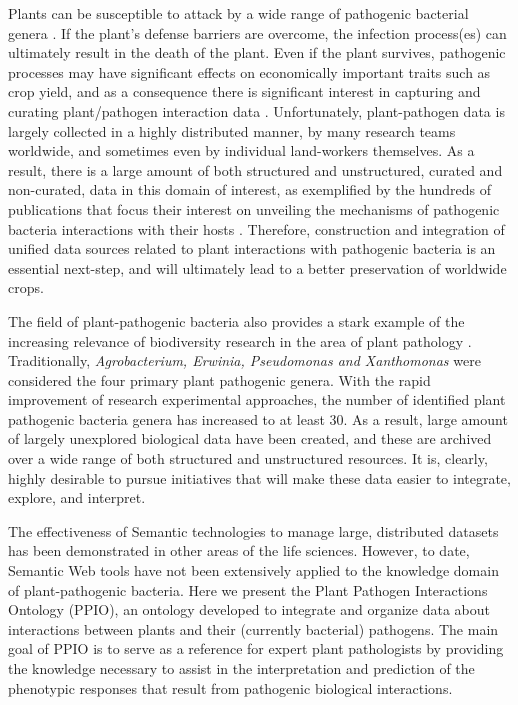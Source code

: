 \documentclass[sw]{iosart2c}
\begin{document}
Plants can be susceptible to attack by a wide range of pathogenic bacterial genera \cite{Mansfield}. If the plant's defense barriers are overcome, the infection process(es) can ultimately result in the death of the plant. Even if the plant survives, pathogenic processes may have significant effects on economically important traits such as crop yield, and as a consequence there is significant interest in capturing and curating plant/pathogen interaction data \cite{Montesinos}. Unfortunately, plant-pathogen data is largely collected in a highly distributed manner, by many research teams worldwide, and sometimes even by individual land-workers themselves.  As a result, there is a large amount of both structured and unstructured, curated and non-curated, data in this domain of interest, as exemplified by the hundreds of publications that focus their interest on unveiling the mechanisms of pathogenic bacteria interactions with their hosts \cite{DeWit} \cite {Dodds}. Therefore, construction and integration of unified data sources related to plant interactions with pathogenic bacteria is an essential next-step, and will ultimately lead to a better preservation of worldwide crops.

The field of plant-pathogenic bacteria also provides a stark example of the increasing relevance of biodiversity research in the area of plant pathology \cite{Bull2010}. Traditionally, {\itshape Agrobacterium, Erwinia, Pseudomonas and Xanthomonas} were considered the four primary plant pathogenic genera. With the rapid improvement of research experimental approaches, the number of identified plant pathogenic bacteria genera has increased to at least 30. As a result, large amount of largely unexplored biological data have been created, and these are archived over a wide range of both structured and unstructured resources. It is, clearly, highly desirable to pursue initiatives that will make these data easier to integrate, explore, and interpret.

The effectiveness of Semantic technologies to manage large, distributed datasets has been demonstrated in other areas of the life sciences. However, to date, Semantic Web tools have not been extensively applied to the knowledge domain of plant-pathogenic bacteria. Here we present the Plant Pathogen Interactions Ontology (PPIO), an ontology developed to integrate and organize data about interactions between plants and their (currently bacterial) pathogens. The main goal of PPIO is to serve as a reference for expert plant pathologists by providing the knowledge necessary to assist in the interpretation and prediction of the phenotypic responses that result from pathogenic biological interactions.
\end{document}
